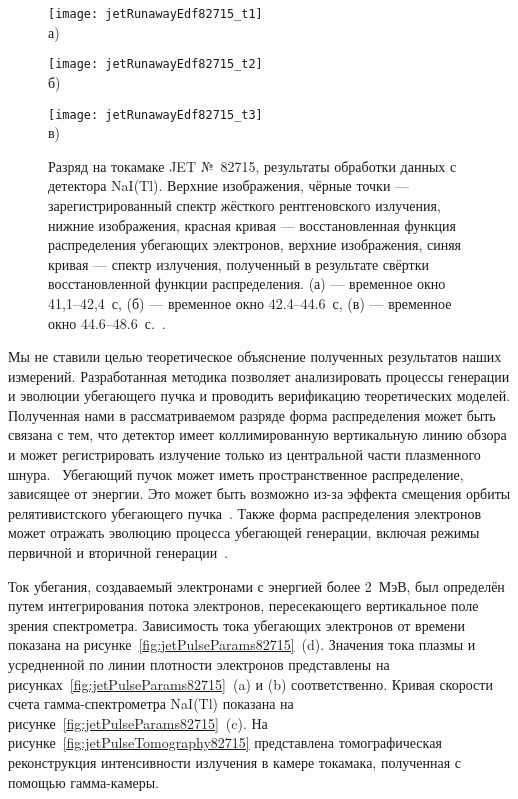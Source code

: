 \begin{figure}[ht]
    \begin{minipage}[b][][b]{0.42\linewidth}\centering
        \texttt{[image: jetRunawayEdf82715\_t1]} \\ а)
    \end{minipage}
    \hfill
    \begin{minipage}[b][][b]{0.42\linewidth}\centering
        \texttt{[image: jetRunawayEdf82715\_t2]} \\ б)
    \end{minipage}
    \hfill
    \begin{minipage}[b][][b]{0.42\linewidth}\centering
        \texttt{[image: jetRunawayEdf82715\_t3]} \\ в)
    \end{minipage}
    \caption{ Разряд на токамаке JET №~82715, результаты обработки данных с детектора NaI(Tl). Верхние изображения, чёрные точки --- зарегистрированный спектр жёсткого рентгеновского излучения, нижние изображения, красная кривая --- восстановленная функция распределения убегающих электронов, верхние изображения, синяя кривая --- спектр излучения, полученный в результате свёртки восстановленной функции распределения. (а) --- временное окно 41,1--42,4~с, (б) --- временное окно 42.4--44.6~с, (в) --- временное окно 44.6--48.6~с.~\cite{Shevelev2013}. }
    \label{fig:jetRunawayEdf82715}
\end{figure}



Мы не ставили целью теоретическое объяснение полученных результатов наших измерений. Разработанная методика позволяет анализировать процессы генерации и эволюции убегающего пучка и проводить верификацию теоретических моделей. Полученная нами в рассматриваемом разряде форма распределения может быть связана с тем, что детектор имеет коллимированную вертикальную линию обзора и может регистрировать излучение только из центральной части плазменного шнура.~\cite{Shevelev2013} Убегающий пучок может иметь пространственное распределение, зависящее от энергии. Это может быть возможно из-за эффекта смещения орбиты релятивистского убегающего пучка~\cite{Knoepfel1979}. Также форма распределения электронов может отражать эволюцию процесса убегающей генерации, включая режимы первичной и вторичной генерации~\cite{Helander2002}.

Ток убегания, создаваемый электронами с энергией более 2~МэВ, был определён путем интегрирования потока электронов, пересекающего вертикальное поле зрения спектрометра. Зависимость тока убегающих электронов от времени показана на рисунке~\ref{fig:jetPulseParams82715}~(d). Значения тока плазмы и усредненной по линии плотности электронов представлены на рисунках~\ref{fig:jetPulseParams82715}~(a) и (b) соответственно. Кривая скорости счета гамма-спектрометра NaI(Tl) показана на рисунке~\ref{fig:jetPulseParams82715}~(c). На рисунке~\ref{fig:jetPulseTomography82715} представлена томографическая реконструкция интенсивности излучения в камере токамака, полученная с помощью гамма-камеры.

